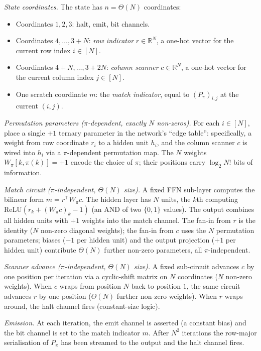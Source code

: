 \documentclass{article}
\theoremstyle{definition}
\newcommand{\R}{\mathbb{R}}
\begin{document}
\emph{State coordinates.} The state has $n = \Theta(N)$ coordinates:
\begin{itemize}
  \item Coordinates $1, 2, 3$: halt, emit, bit channels.
  \item Coordinates $4, \ldots, 3 + N$: \emph{row indicator} $r \in \R^N$, a one-hot
        vector for the current row index $i \in [N]$.
  \item Coordinates $4 + N, \ldots, 3 + 2N$: \emph{column scanner} $c \in \R^N$, a
        one-hot vector for the current column index $j \in [N]$.
  \item One scratch coordinate $m$: the \emph{match indicator}, equal to
        $(P_\pi)_{i,j}$ at the current $(i, j)$.
\end{itemize}

\emph{Permutation parameters ($\pi$-dependent, exactly $N$ non-zeros).} For each $i \in [N]$, place a single $+1$ ternary parameter in the network's
``edge table'': specifically, a weight from row coordinate $r_i$ to a hidden
unit $h_i$, and the column scanner $c$ is wired into $h_i$ via a $\pi$-dependent
permutation map. The $N$ weights $W_\pi[k, \pi(k)] = +1$ encode the choice of
$\pi$; their positions carry $\log_2 N!$ bits of information.

\emph{Match circuit ($\pi$-independent, $\Theta(N)$ size).} A fixed FFN sub-layer computes the bilinear form $m = r^\top W_\pi c$. The
hidden layer has $N$ units, the $k$th computing $\text{ReLU}(r_k + (W_\pi c)_k -
  1)$ (an AND of two $\{0,1\}$ values). The output combines all hidden units with
$+1$ weights into the match channel. The fan-in from $r$ is the identity ($N$
non-zero diagonal weights); the fan-in from $c$ uses the $N$ permutation
parameters; biases ($-1$ per hidden unit) and the output projection ($+1$ per
hidden unit) contribute $\Theta(N)$ further non-zero parameters, all
$\pi$-independent.

\emph{Scanner advance ($\pi$-independent, $\Theta(N)$ size).} A fixed sub-circuit advances $c$ by one position per iteration via a cyclic-shift
matrix on $N$ coordinates ($N$ non-zero weights). When $c$ wraps from position
$N$ back to position $1$, the same circuit advances $r$ by one position
($\Theta(N)$ further non-zero weights). When $r$ wraps around, the halt channel
fires (constant-size logic).

\emph{Emission.} At each iteration, the emit channel is asserted (a constant
bias) and the bit channel is set to the match indicator $m$. After $N^2$
iterations the row-major serialisation of $P_\pi$ has been streamed to the
output and the halt channel fires.
\end{document}
